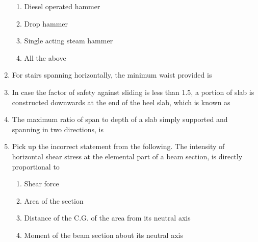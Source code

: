 \documentclass[11pt,a4paper]{article}
\begin{document}
\begin{enumerate}
\begin{enumerate}[label=\Alph*.]
\item{Diesel operated hammer}
\item{Drop hammer}
\item{Single acting steam hammer}
\item{All the above}
\end{enumerate}
\item{For stairs spanning horizontally, the minimum waist provided is}
\\\begin{enumerate*}[itemjoin=\qquad, label=\Alph*.]
\item{4 cm}
\item{6 cm}
\item{8 cm}
\item{12 cm}
\end{enumerate*}
\item{In case the factor of safety against sliding is less than 1.5, a portion of slab is constructed downwards at the end of the heel slab, which is known as}
\\
\item{The maximum ratio of span to depth of a slab simply supported and spanning in two directions, is}
\\
\item{Pick up the incorrect statement from the following. The intensity of horizontal shear stress at the elemental part of a beam section, is directly proportional to}
\begin{enumerate}[label=\Alph*.]
\item{Shear force}
\item{Area of the section}
\item{Distance of the C.G. of the area from its neutral axis}
\item{Moment of the beam section about its neutral axis}
\end{enumerate}

\end{enumerate}
\end{document}
